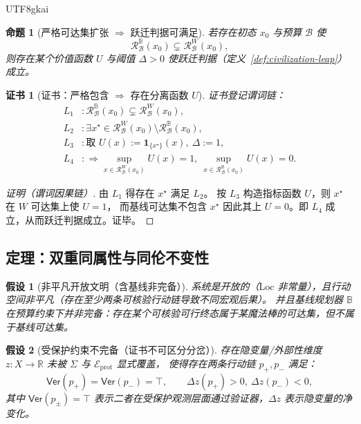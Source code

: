 \documentclass[12pt]{article}
\newtheorem{assumption}{假设}[section]
\newtheorem{proposition}{命题}[section]
\newtheorem{Certificate}{证书}[section]
\newcommand{\RR}{\mathbb{R}}
\begin{document}
\begin{CJK*}{UTF8}{gkai}
\begin{proposition}[严格可达集扩张 $\Rightarrow$ 跃迁判据可满足]
\label{prop:strict-inclusion-implies-leap}
若存在初态 $x_0$ 与预算 $\mathcal{B}$ 使
\[
  \mathcal{R}^{\mathbb{B}}_{\mathcal{B}}(x_0)\subsetneq \mathcal{R}^{W}_{\mathcal{B}}(x_0),
\]
则存在某个价值函数 $U$ 与阈值 $\Delta>0$ 使跃迁判据（定义~\ref{def:civilization-leap}）成立。
\end{proposition}

\begin{Certificate}[证书：严格包含 $\Rightarrow$ 存在分离函数 $U$]
\label{cert:strict-inclusion-implies-leap}
证书登记谓词链：
\[
\begin{aligned}
  L_1 &: \mathcal{R}^{\mathbb{B}}_{\mathcal{B}}(x_0)\subsetneq \mathcal{R}^{W}_{\mathcal{B}}(x_0),\\
  L_2 &: \exists x^\star\in \mathcal{R}^{W}_{\mathcal{B}}(x_0)\setminus \mathcal{R}^{\mathbb{B}}_{\mathcal{B}}(x_0),\\
  L_3 &: \text{取 }U(x):=\mathbf{1}_{\{x^\star\}}(x),\ \Delta:=1,\\
  L_4 &: \Rightarrow \sup_{x\in \mathcal{R}^{W}_{\mathcal{B}}(x_0)}U(x)=1,\ \sup_{x\in \mathcal{R}^{\mathbb{B}}
    _{\mathcal{B}}(x_0)}U(x)=0.
\end{aligned}
\]
\end{Certificate}

\begin{proof}[证明（谓词因果链）]
由 $L_1$ 得存在 $x^\star$ 满足 $L_2$。
按 $L_3$ 构造指标函数 $U$，则 $x^\star$ 在 $W$ 可达集上使 $U=1$，
而基线可达集不包含 $x^\star$ 因此其上 $U=0$。即 $L_4$ 成立，从而跃迁判据成立。证毕。
\end{proof}

\subsection{定理：双重同属性与同伦不变性}
\label{sec:magic-wand-dual-theorem}

\begin{assumption}[非平凡开放文明（含基线非完备）]
\label{asm:dual-A1}
系统是开放的（$\mathrm{Loc}$ 非常量），且行动空间非平凡（存在至少两条可核验行动链导致不同宏观后果）。
并且基线规划器 $\mathbb{B}$ 在预算约束下并非完备：存在某个可核验可行终态属于某魔法棒的可达集，但不属于基线可达集。
\end{assumption}

\begin{assumption}[受保护约束不完备（证书不可区分分岔）]
\label{asm:dual-A2}
存在隐变量/外部性维度 $z:X\to\RR$ 未被 $\Sigma$ 与 $\mathcal{E}_{\mathrm{prot}}$ 显式覆盖，
使得存在两条行动链 $p_+,p_-$ 满足：
\[
  \mathsf{Ver}(p_+)=\mathsf{Ver}(p_-)=\top,
  \qquad
  \Delta z(p_+)>0,\ \Delta z(p_-)<0,
\]
其中 $\mathsf{Ver}(p_\pm)=\top$ 表示二者在受保护观测层面通过验证器，$\Delta z$ 表示隐变量的净变化。
\end{assumption}


\end{CJK*}
\end{document}

